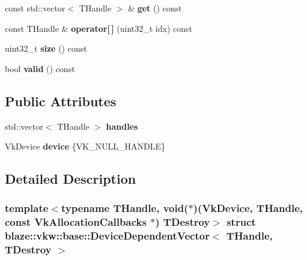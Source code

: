 \begin{DoxyCompactItemize}
const std\+::vector$<$ T\+Handle $>$ \& {\bfseries get} () const
\item 
\mbox{\label{structblaze_1_1vkw_1_1base_1_1DeviceDependentVector_a2f32b226bb32ae1c6a17f2a4f3ce5928}} 
const T\+Handle \& {\bfseries operator\mbox{[}$\,$\mbox{]}} (uint32\+\_\+t idx) const
\item 
\mbox{\label{structblaze_1_1vkw_1_1base_1_1DeviceDependentVector_a37d08e0fd17b1c72cc29ced8e193c411}} 
uint32\+\_\+t {\bfseries size} () const
\item 
\mbox{\label{structblaze_1_1vkw_1_1base_1_1DeviceDependentVector_a08fbc01614054db54de510a4a85323fd}} 
bool {\bfseries valid} () const
\end{DoxyCompactItemize}
\subsection*{Public Attributes}
\begin{DoxyCompactItemize}
\item 
\mbox{\label{structblaze_1_1vkw_1_1base_1_1DeviceDependentVector_ad413ae2c074ca24d70b0b3c5e4e58a6e}} 
std\+::vector$<$ T\+Handle $>$ {\bfseries handles}
\item 
\mbox{\label{structblaze_1_1vkw_1_1base_1_1DeviceDependentVector_a413a1eb0a0c780d44dafc19550946e40}} 
Vk\+Device {\bfseries device} \{V\+K\+\_\+\+N\+U\+L\+L\+\_\+\+H\+A\+N\+D\+LE\}
\end{DoxyCompactItemize}


\subsection{Detailed Description}
\subsubsection*{template$<$typename T\+Handle, void($\ast$)(\+Vk\+Device, T\+Handle, const Vk\+Allocation\+Callbacks $\ast$) T\+Destroy$>$\newline
struct blaze\+::vkw\+::base\+::\+Device\+Dependent\+Vector$<$ T\+Handle, T\+Destroy $>$}

